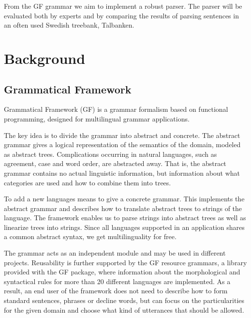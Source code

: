 \documentclass[submission]{eptcs} %
\begin{document}
From the GF grammar we aim to implement a robust parser. 
The parser will be evaluated both by experts and by comparing the results of
parsing sentences in an often used Swedish treebank, Talbanken.


\section{Background}
\subsection{Grammatical Framework}
\label{sec:gf}



Grammatical Framework\cite{gf} (GF) is a grammar formalism based on functional
programming, designed for multilingual grammar applications.

The key idea
is to divide the grammar into abstract and concrete.
The abstract grammar gives a logical representation of the semantics of the
domain, modeled as abstract trees. Complications occurring in
natural languages, such as agreement, case and word order, are abstracted away. 
That is, the abstract grammar contains no actual linguistic information, but
information about what categories are used and how to combine them into trees.

To add a new languages means to give a concrete grammar. This implements
the abstract grammar and describes how to translate abstract
trees to strings of the language. The framework enables us to parse strings into 
abstract trees as well as linearize trees into strings.
Since all languages supported in an application shares a common abstract syntax,
we get multilinguality for free.

The grammar acts as an independent module and may be used in different
projects.
Reusability is further supported by the GF resource grammars\cite{resource},
a library provided with the GF package, 
where information about the morphological and
syntactical rules for more than 20 different languages are implemented.
As a result, an end user of the framework does not need to describe how to 
form standard sentences, phrases or decline words, but can focus on the
particularities for the given domain and choose what kind of 
utterances that should be allowed.
\end{document}
